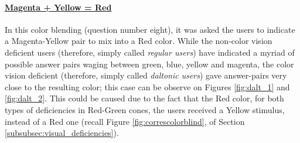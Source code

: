 \paragraph{\ul{Magenta + Yellow = Red}}
%
In this color blending (question number eight), it was asked the users to indicate a Magenta-Yellow pair to mix into a Red color. While the non-color vision deficient users (therefore, simply called \emph{regular users}) have indicated a myriad of possible answer pairs waging between green, blue, yellow and magenta, the
color vision deficient (therefore, simply called \emph{daltonic users}) gave answer-pairs very close to the resulting color; this case can be observe on Figures \ref{fig:dalt_1} and \ref{fig:dalt_2}. This could be caused due to the fact that the Red color, for both types of deficiencies in Red-Green cones, the users
received a Yellow stimulus, instead of a Red one (recall Figure \ref{fig:correscolorblind}, of Section \ref{subsubsec:visual_deficiencies}).
%
